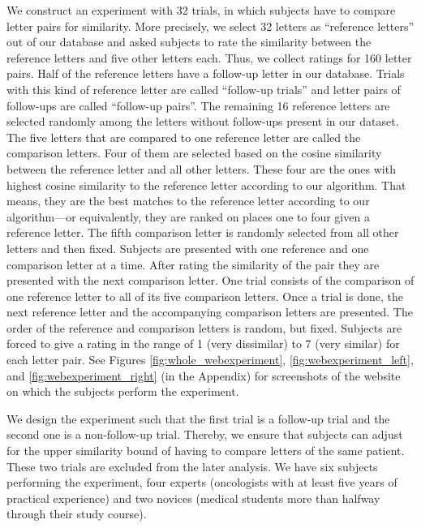 We construct an experiment with 32 trials, in which subjects have to compare letter pairs for similarity. More precisely, we select 32 letters as ``reference letters'' out of our database and asked subjects to rate the similarity between the reference letters and five other letters each. Thus, we collect ratings for 160 letter pairs. Half of the reference letters have a follow-up letter in our database. Trials with this kind of reference letter are called ``follow-up trials'' and letter pairs of follow-ups are called ``follow-up pairs''. The remaining 16 reference letters are selected randomly among the letters without follow-ups present in our dataset. The five letters that are compared to one reference letter are called the comparison letters. Four of them are selected based on the cosine similarity between the reference letter and all other letters. These four are the ones with highest cosine similarity to the reference letter according to our algorithm. That means, they are the best matches to the reference letter according to our algorithm---or equivalently, they are ranked on places one to four given a reference letter. The fifth comparison letter is randomly selected from all other letters and then fixed. Subjects are presented with one reference and one comparison letter at a time. After rating the similarity of the pair they are presented with the next comparison letter. One trial consists of the comparison of one reference letter to all of its five comparison letters. Once a trial is done, the next reference letter and the accompanying comparison letters are presented. The order of the reference and comparison letters is random, but fixed. Subjects are forced to give a rating in the range of 1 (very dissimilar) to 7 (very similar) for each letter pair. See Figures \ref{fig:whole_webexperiment}, \ref{fig:webexperiment_left}, and \ref{fig:webexperiment_right} (in the Appendix) for screenshots of the website on which the subjects perform the experiment.

We design the experiment such that the first trial is a follow-up trial and the second one is a non-follow-up trial. Thereby, we ensure that subjects can adjust for the upper similarity bound of having to compare letters of the same patient. These two trials are excluded from the later analysis. We have six subjects performing the experiment, four experts (oncologists with at least five years of practical experience) and two novices (medical students more than halfway through their study course).






